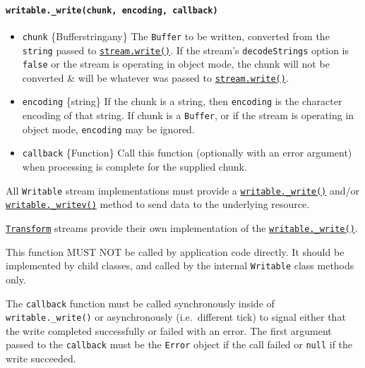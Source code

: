\paragraph{\texorpdfstring{\texttt{writable.\_write(chunk,\ encoding,\ callback)}}{writable.\_write(chunk, encoding, callback)}}\label{writable._writechunk-encoding-callback}

\begin{itemize}
\tightlist
\item
  \texttt{chunk} \{Buffer\textbar string\textbar any\} The
  \texttt{Buffer} to be written, converted from the \texttt{string}
  passed to
  \hyperref[writablewritechunk-encoding-callback]{\texttt{stream.write()}}.
  If the stream's \texttt{decodeStrings} option is \texttt{false} or the
  stream is operating in object mode, the chunk will not be converted \&
  will be whatever was passed to
  \hyperref[writablewritechunk-encoding-callback]{\texttt{stream.write()}}.
\item
  \texttt{encoding} \{string\} If the chunk is a string, then
  \texttt{encoding} is the character encoding of that string. If chunk
  is a \texttt{Buffer}, or if the stream is operating in object mode,
  \texttt{encoding} may be ignored.
\item
  \texttt{callback} \{Function\} Call this function (optionally with an
  error argument) when processing is complete for the supplied chunk.
\end{itemize}

All \texttt{Writable} stream implementations must provide a
\hyperref[writable_writechunk-encoding-callback]{\texttt{writable.\_write()}}
and/or
\hyperref[writable_writevchunks-callback]{\texttt{writable.\_writev()}}
method to send data to the underlying resource.

\hyperref[class-streamtransform]{\texttt{Transform}} streams provide
their own implementation of the
\hyperref[writable_writechunk-encoding-callback]{\texttt{writable.\_write()}}.

This function MUST NOT be called by application code directly. It should
be implemented by child classes, and called by the internal
\texttt{Writable} class methods only.

The \texttt{callback} function must be called synchronously inside of
\texttt{writable.\_write()} or asynchronously (i.e.~different tick) to
signal either that the write completed successfully or failed with an
error. The first argument passed to the \texttt{callback} must be the
\texttt{Error} object if the call failed or \texttt{null} if the write
succeeded.

